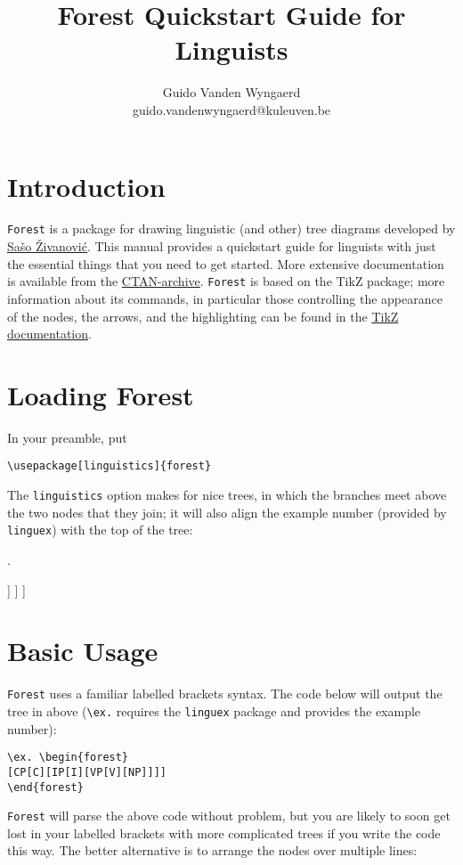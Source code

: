 \documentclass[english,12pt]{article}
\title{Forest Quickstart Guide for Linguists}
\author{Guido Vanden Wyngaerd\\
guido.vandenwyngaerd@kuleuven.be}
\begin{document}
\maketitle

\tableofcontents

\section{Introduction}

\texttt{Forest} is a package for drawing linguistic (and other) tree diagrams developed by \href{http://spj.ff.uni-lj.si/zivanovic/}{Sašo Živanović}. This manual provides a quickstart guide for linguists with just the essential things that you need to get started. More extensive documentation is available from the \href{https://www.ctan.org/pkg/forest}{CTAN-archive}. \texttt{Forest} is based on the TikZ package; more information about its commands, in particular those controlling the appearance of the nodes, the arrows, and the highlighting can be found in the \href{https://sourceforge.net/projects/pgf/}{TikZ documentation}.

\section{Loading Forest}

In your preamble, put \begin{verbatim}
\usepackage[linguistics]{forest}\end{verbatim}
The \texttt{linguistics} option makes for nice trees, in which the branches meet above the two nodes that they join; it will also align the example number (provided by \texttt{linguex}) with the top of the tree:

\ex.\label{1}
\begin{forest}
[CP [C] 
	[IP [I] 
		[VP [V]
			[NP]  
		] 
	] 
]
\end{forest}


\section{Basic Usage}

\texttt{Forest} uses a familiar labelled brackets syntax. The code below will output the tree in \Last above (\verb|\ex.| requires the \texttt{linguex} package and provides the example number):

\begin{lstlisting}[basicstyle=\ttfamily,basewidth=0.5em]
\ex. \begin{forest}
[CP[C][IP[I][VP[V][NP]]]]
\end{forest}
\end{lstlisting}
\texttt{Forest} will parse the above code without problem, but you are likely to soon get lost in your labelled brackets with more complicated trees if you write the code this way. The better alternative is to arrange the nodes over multiple lines:
\end{document}
